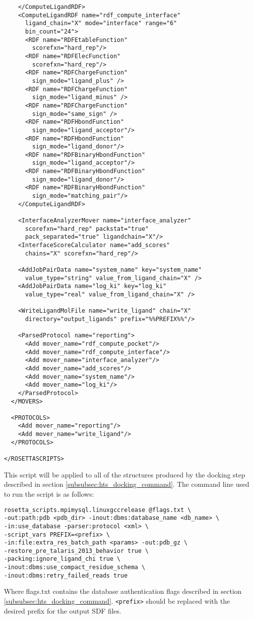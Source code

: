 \begin{verbatim}
    </ComputeLigandRDF>
    <ComputeLigandRDF name="rdf_compute_interface"
      ligand_chain="X" mode="interface" range="6" 
      bin_count="24">
      <RDF name="RDFEtableFunction"
        scorefxn="hard_rep"/>
      <RDF name="RDFElecFunction"
        scorefxn="hard_rep"/>
      <RDF name="RDFChargeFunction"
        sign_mode="ligand_plus" />
      <RDF name="RDFChargeFunction"
        sign_mode="ligand_minus" />
      <RDF name="RDFChargeFunction"
        sign_mode="same_sign" />
      <RDF name="RDFHbondFunction"
        sign_mode="ligand_acceptor"/>
      <RDF name="RDFHbondFunction"
        sign_mode="ligand_donor"/> 
      <RDF name="RDFBinaryHbondFunction"
        sign_mode="ligand_acceptor"/>
      <RDF name="RDFBinaryHbondFunction"
        sign_mode="ligand_donor"/>
      <RDF name="RDFBinaryHbondFunction"
        sign_mode="matching_pair"/>  
    </ComputeLigandRDF>

    <InterfaceAnalyzerMover name="interface_analyzer"
      scorefxn="hard_rep" packstat="true"
      pack_separated="true" ligandchain="X"/>
    <InterfaceScoreCalculator name="add_scores" 
      chains="X" scorefxn="hard_rep"/>
    
    <AddJobPairData name="system_name" key="system_name"
      value_type="string" value_from_ligand_chain="X" />
    <AddJobPairData name="log_ki" key="log_ki"
      value_type="real" value_from_ligand_chain="X" />
    
    <WriteLigandMolFile name="write_ligand" chain="X"
      directory="output_ligands" prefix="%%PREFIX%%"/>

    <ParsedProtocol name="reporting">
      <Add mover_name="rdf_compute_pocket"/>
      <Add mover_name="rdf_compute_interface"/>
      <Add mover_name="interface_analyzer"/>
      <Add mover_name="add_scores"/>
      <Add mover_name="system_name"/>
      <Add mover_name="log_ki"/>
    </ParsedProtocol>
  </MOVERS>
  
  <PROTOCOLS>
    <Add mover_name="reporting"/>
    <Add mover_name="write_ligand"/>
  </PROTOCOLS>
  
</ROSETTASCRIPTS>
\end{verbatim}
\doublespace
This script will be applied to all of the structures produced by the docking step described in section \ref{subsubsec:hts_docking_command}.
The command line used to run the script is as follows:
\singlespace
\begin{verbatim}
rosetta_scripts.mpimysql.linuxgccrelease @flags.txt \
-out:path:pdb <pdb_dir> -inout:dbms:database_name <db_name> \
-in:use_database -parser:protocol <xml> \
-script_vars PREFIX=<prefix> \
-in:file:extra_res_batch_path <params> -out:pdb_gz \
-restore_pre_talaris_2013_behavior true \
-packing:ignore_ligand_chi true \
-inout:dbms:use_compact_residue_schema \
-inout:dbms:retry_failed_reads true
\end{verbatim}
\doublespace
Where flags.txt contains the database authentication flags described in section \ref{subsubsec:hts_docking_command}.
\texttt{<prefix>} should be replaced with the desired prefix for the output \ac{SDF} files.  

